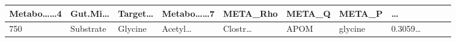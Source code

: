 \documentclass[
]{article}
\begin{document}
\begin{longtable}[]{@{}lllllllllll@{}}
\begin{minipage}[b]{0.09\columnwidth}
Metabo\ldots\ldots4\strut
\end{minipage} & \begin{minipage}[b]{0.07\columnwidth}\raggedright
Gut.Mi\ldots{}\strut
\end{minipage} & \begin{minipage}[b]{0.07\columnwidth}\raggedright
Target\ldots{}\strut
\end{minipage} & \begin{minipage}[b]{0.09\columnwidth}\raggedright
Metabo\ldots\ldots7\strut
\end{minipage} & \begin{minipage}[b]{0.07\columnwidth}\raggedright
META\_Rho\strut
\end{minipage} & \begin{minipage}[b]{0.07\columnwidth}\raggedright
META\_Q\strut
\end{minipage} & \begin{minipage}[b]{0.07\columnwidth}\raggedright
META\_P\strut
\end{minipage} & \begin{minipage}[b]{0.03\columnwidth}\raggedright
\ldots{}\strut
\end{minipage}\tabularnewline
\midrule
\endhead
\begin{minipage}[t]{0.03\columnwidth}\raggedright
750\strut
\end{minipage} & \begin{minipage}[t]{0.07\columnwidth}\raggedright
Substrate\strut
\end{minipage} & \begin{minipage}[t]{0.07\columnwidth}\raggedright
Glycine\strut
\end{minipage} & \begin{minipage}[t]{0.09\columnwidth}\raggedright
Acetyl\ldots{}\strut
\end{minipage} & \begin{minipage}[t]{0.07\columnwidth}\raggedright
Clostr\ldots{}\strut
\end{minipage} & \begin{minipage}[t]{0.07\columnwidth}\raggedright
APOM\strut
\end{minipage} & \begin{minipage}[t]{0.09\columnwidth}\raggedright
glycine\strut
\end{minipage} & \begin{minipage}[t]{0.07\columnwidth}\raggedright
0.3059\ldots{}\strut
\end{minipage} & \begin{minipage}[t]{0.07\columnwidth}\raggedright

\end{minipage}
\end{longtable}
\end{document}
